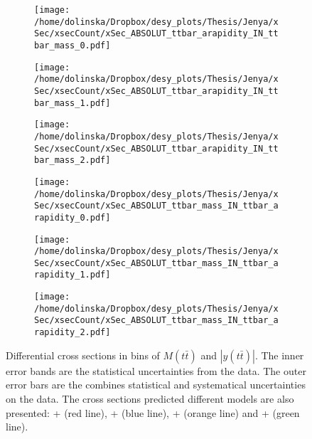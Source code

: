 \begin{sidewaysfigure}[p]
\centering
\begin{subfigure}
  \centering
  \texttt{[image: /home/dolinska/Dropbox/desy\_plots/Thesis/Jenya/xSec/xsecCount/xSec\_ABSOLUT\_ttbar\_arapidity\_IN\_ttbar\_mass\_0.pdf]}
\end{subfigure}
\begin{subfigure}
  \centering
  \texttt{[image: /home/dolinska/Dropbox/desy\_plots/Thesis/Jenya/xSec/xsecCount/xSec\_ABSOLUT\_ttbar\_arapidity\_IN\_ttbar\_mass\_1.pdf]}
\end{subfigure}
\begin{subfigure}
  \centering
  \texttt{[image: /home/dolinska/Dropbox/desy\_plots/Thesis/Jenya/xSec/xsecCount/xSec\_ABSOLUT\_ttbar\_arapidity\_IN\_ttbar\_mass\_2.pdf]}
\end{subfigure}
\begin{subfigure}
  \centering
  \texttt{[image: /home/dolinska/Dropbox/desy\_plots/Thesis/Jenya/xSec/xsecCount/xSec\_ABSOLUT\_ttbar\_mass\_IN\_ttbar\_arapidity\_0.pdf]}
\end{subfigure}
\begin{subfigure}
  \centering
  \texttt{[image: /home/dolinska/Dropbox/desy\_plots/Thesis/Jenya/xSec/xsecCount/xSec\_ABSOLUT\_ttbar\_mass\_IN\_ttbar\_arapidity\_1.pdf]}
\end{subfigure}
\begin{subfigure}
  \centering
  \texttt{[image: /home/dolinska/Dropbox/desy\_plots/Thesis/Jenya/xSec/xsecCount/xSec\_ABSOLUT\_ttbar\_mass\_IN\_ttbar\_arapidity\_2.pdf]}
\end{subfigure}
\caption{Differential cross sections in bins of $M(t\bar{t})$ and $|y(t\bar{t})|$. The inner error bands are the statistical uncertainties from the data.
         The outer error bars are the combines statistical and systematical uncertainties on the data. The cross sections predicted different models are also presented:
         \MG + \PYTHIA (red line), \Powheg + \PYTHIA (blue line), \Powheg + \HERWIG (orange line) and \MCNLO + \HERWIG (green line).}
\label{fig:XSU_2D_ytt_Mtt}
\end{sidewaysfigure}

